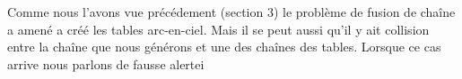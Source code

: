 	Comme nous l'avons vue précédement (section 3) le problème de fusion de chaîne a amené a créé les tables arc-en-ciel. Mais il se peut aussi qu'il y ait collision entre la chaîne que nous générons et une des chaînes des tables. Lorsque ce cas arrive nous parlons de fausse alertei


	



\endinput{}

